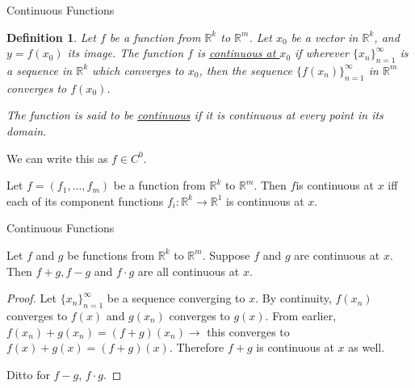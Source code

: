 \documentclass[xcolor=dvipsnames, compress, t]{beamer}
\newtheorem{defin}{Definition}
\newcommand{\vs}{\vspace{\baselineskip}}
\newcommand{\vf}{\vspace{5pt}}
\begin{document}
\begin{frame}{Continuous Functions}

\begin{defin}
Let $f$ be a function from $\mathds{R}^k$ to $\mathds{R}^m$. Let $x_0$ be a vector in $\mathds{R}^k$, and $y=f(x_0)$ its image. The function $f$ is \underline{continuous at $x_0$} if wherever $\{x_n\}_{n=1}^\infty$ is a sequence in $\mathds{R}^k$ which converges to $x_0$, then the sequence $\{f(x_n)\}_{n=1}^\infty$ in $\mathds{R}^m$ converges to $f(x_0)$.

\vf The function is said to be \underline{continuous} if it is continuous at every point in its domain.
\end{defin} \pause

\vf We can write this as $f \in C^0$. \pause

\vs
\begin{theorem}
Let $f=(f_1, ..., f_m)$ be a function from $\mathds{R}^k$ to $\mathds{R}^m$. Then $f$is continuous at $x$ iff each of its component functions $f_i:\mathds{R}^k \rightarrow \mathds{R}^1$ is continuous at $x$.
\end{theorem}

\end{frame}


\begin{frame}{Continuous Functions}

\begin{theorem}
Let $f$ and $g$ be functions from $\mathds{R}^k$ to $\mathds{R}^m$. Suppose $f$ and $g$ are continuous at $x$. Then $f+g, f-g$ and $f\cdot g$ are all continuous at $x$.
\end{theorem} \pause


\vf
\begin{proof}
Let $\{x_n\}_{n=1}^\infty$ be a sequence converging to $x$. \pause By continuity, $f(x_n)$ converges to $f(x)$ and $g(x_n)$ converges to $g(x)$. \pause From earlier, $f(x_n) + g(x_n) = (f+g)(x_n) \rightarrow$ this converges to $f(x) + g(x) = (f+g)(x)$. \pause Therefore $f+g$ is continuous at $x$ as well. \pause

\vs Ditto for $f-g$, $f\cdot g$.
\end{proof}


\end{frame}
\end{document}
